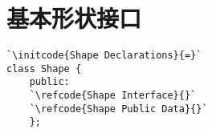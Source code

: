 \section{基本形状接口}\label{sec:基本形状接口}

\label{code:overview_Shape}
\begin{lstlisting}
`\initcode{Shape Declarations}{=}`
class Shape {
    public:
    `\refcode{Shape Interface}{}`
    `\refcode{Shape Public Data}{}`
    };
\end{lstlisting}